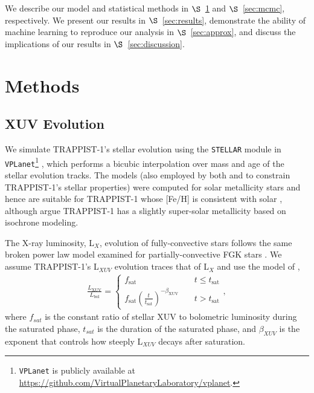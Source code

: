 \documentclass[twocolumn]{aastex62}
\newcommand{\vplanet}[0]{\texttt{VPLanet}\xspace}
\newcommand{\stellar}[0]{\texttt{STELLAR}\xspace}
\begin{document}
We describe our model and statistical methods in $\S$~\ref{sec:methods} and $\S$~\ref{sec:mcmc}, respectively. We present our results in $\S$~\ref{sec:results}, demonstrate the ability of machine learning to reproduce our analysis in $\S$~\ref{sec:approx}, and discuss the implications of our results in $\S$~\ref{sec:discussion}.


\section{Methods} \label{sec:methods}

\subsection{XUV Evolution} \label{sec:model}

We simulate TRAPPIST-1's stellar evolution using the \stellar module in \vplanet\footnote{\vplanet is publicly available at \href{https://github.com/VirtualPlanetaryLaboratory/vplanet}{https://github.com/VirtualPlanetaryLaboratory/vplanet}.} \citep{Barnes2019}, which performs a bicubic interpolation over mass and age of the \citet{Baraffe2015} stellar evolution tracks. The \citet{Baraffe2015} models (also employed by both \citet{Burgasser2017} and \citet{vanGrootel2018} to constrain TRAPPIST-1's stellar properties) were computed for solar metallicity stars and hence are suitable for TRAPPIST-1 whose [Fe/H] is consistent with solar \citep{Gillon2016}, although \citet{Burgasser2017} argue TRAPPIST-1 has a slightly super-solar metallicity based on isochrone modeling.

The X-ray luminosity, L$_{X}$, evolution of fully-convective stars follows the same broken power law model examined for partially-convective FGK stars \citep{Wright2016,Wright2018}. We assume TRAPPIST-1's L$_{XUV}$ evolution traces that of L$_{X}$ and use the model of \citet{Ribas2005},
\begin{align}
\label{eqn:lxuv}
\frac{L_\mathrm{XUV}}{L_\mathrm{bol}} = \left\{
				\begin{array}{lcr}
					f_\mathrm{sat} &\ & t \leq t_\mathrm{sat} \\
					f_\mathrm{sat}\left(\frac{t}{t_\mathrm{sat}}\right)^{-\beta_\mathrm{XUV}} &\ & t > t_\mathrm{sat}
				\end{array}
				\right.,
\end{align}
where $f_{sat}$ is the constant ratio of stellar XUV to bolometric luminosity during the saturated phase, $t_{sat}$ is the duration of the saturated phase, and $\beta_{XUV}$ is the exponent that controls how steeply L$_{XUV}$ decays after saturation. 
\end{document}
